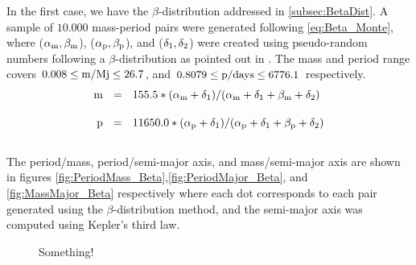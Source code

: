 In the first case, we have the $\beta$-distribution addressed in \autoref{subsec:BetaDist}. A sample of $10.000$ mass-period pairs were generated following \autoref{eq:Beta_Monte}, where ($\alpha_\textnormal{m}, \beta_\textnormal{m}$), ($\alpha_\textnormal{p}, \beta_\textnormal{p}$), and ($\delta_\textnormal{1}, \delta_\textnormal{2}$) were created using pseudo-random numbers following a $\beta$-distribution as pointed out in \citeyear{1538-3881-134-5-2061}. The mass and period range covers $0.008 \leq \textnormal{m/Mj} \leq 26.7$, and $0.8079 \leq \textnormal{p/days} \leq 6776.1$ respectively.\\

\begingroup
\Large
\begin{equation}
  \begin{align*}
  \textnormal{m}~~&=~~155.5*(\alpha_\textnormal{m} + \delta_\textnormal{1}) / (\alpha_\textnormal{m} + \delta_\textnormal{1} + \beta_\textnormal{m} + \delta_\textnormal{2}) \\[10pt]
  \textnormal{p}~~&=~~11650.0*(\alpha_\textnormal{p} + \delta_\textnormal{1}) / (\alpha_\textnormal{p} + \delta_\textnormal{1} + \beta_\textnormal{p} + \delta_\textnormal{2})
 \label{eq:Beta_Monte}
 \end{align*}
\end{equation}
\endgroup \\

The period/mass, period/semi-major axis, and mass/semi-major axis are shown in figures \autoref{fig:PeriodMass_Beta},\autoref{fig:PeriodMajor_Beta}, and  \autoref{fig:MassMajor_Beta} respectively where each dot corresponds to each pair generated using the $\beta$-distribution method, and the semi-major axis was computed using Kepler's third law.\\ 


\begin{figure}[!ht]
\centering
\caption{\scriptsize{Something!}}
\label{fig:PeriodMass_Beta}
\end{figure}

